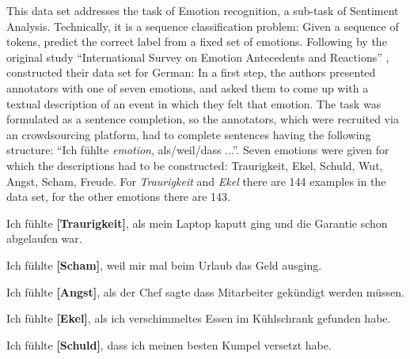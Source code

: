 This data set addresses the task of Emotion recognition, a sub-task of Sentiment Analysis.
Technically, it is a sequence classification problem: Given a sequence of tokens, predict the 
correct label from a fixed set of emotions.
Following by the original study ``International Survey on Emotion Antecedents and Reactions'' 
\citep{scherer1994evidence}, \cite{troiano2019crowdsourcing} constructed their data set for German:
In a first step, the authors presented annotators with one of seven emotions, and asked them to 
come up with a textual description of an event in which they felt that emotion.
The task was formulated as a sentence completion, so the annotators, which were recruited via an 
crowdsourcing platform, had to complete sentences having the following structure: ``Ich fühlte 
\emph{emotion}, als/weil/dass ...''.
Seven emotions were given for which the descriptions had to be constructed:
Traurigkeit, Ekel, Schuld, Wut, Angst, Scham, Freude.
For \emph{Traurigkeit} and \emph{Ekel} there are 144 examples in the data set, for the other 
emotions there are 143.

\begin{examples}
	\item Ich fühlte \textbf{[Traurigkeit]}, als mein Laptop kaputt ging und die Garantie schon abgelaufen war.
\end{examples}
\begin{examples}
	\label{ex:deisear}
	\item  Ich fühlte \textbf{[Scham]}, weil mir mal beim Urlaub das Geld ausging.
\end{examples}
\begin{examples}
	\label{ex:deisear}
	\item Ich fühlte \textbf{[Angst]}, als der Chef sagte dass Mitarbeiter gekündigt werden müssen.
\end{examples}
\begin{examples}
	\label{ex:deisear}
	\item Ich fühlte \textbf{[Ekel]}, als ich verschimmeltes Essen im Kühlschrank gefunden habe.
\end{examples}
\begin{examples}
	\label{ex:deisear}
	\item Ich fühlte \textbf{[Schuld]}, dass ich meinen besten Kumpel versetzt habe.
\end{examples}


